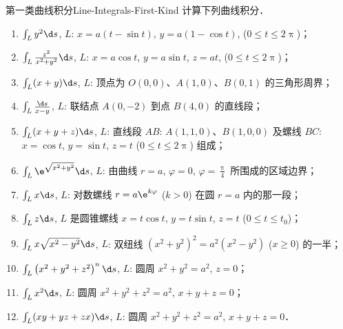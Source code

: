\begin{problem}{第一类曲线积分}{Line-Integrals-First-Kind}
    计算下列曲线积分．
    \begin{enumerate}
        \item $\int_{L} y^{2} \d s$, $L$: $x=a(t-\sin t)$, $y=a(1-\cos t)$, ($0 \le t \le 2 \uppi$)；
        \item $\int_{L} \frac{z^{2}}{x^{2}+y^{2}} \d s$, $L$: $x=a \cos t$, $y=a \sin t$, $z=a t$, ($0 \le t \le 2 \uppi$)；
        \item $\int_{L}(x+y) \d s$, $L$: 顶点为 $O(0,0)$、$A(1,0)$、$B(0,1)$ 的三角形周界；
        \item $\int_{L} \frac{\d s}{x-y}$, $L$: 联结点 $A(0,-2)$ 到点 $B(4,0)$ 的直线段；
        \item $\int_{L}(x+y+z) \d s$, $L$: 直线段 $AB$: $A(1,1,0)$、$B(1,0,0)$ 及螺线 $BC$: $x=\cos t$, $y=\sin t$, $z=t$ ($0 \le t \le 2 \uppi$) 组成；
        \item $\int_{L} \e^{\sqrt{x^{2}+y^{2}}} \d s$, $L$: 由曲线 $r=a$, $\varphi=0$, $\varphi=\frac{\uppi}{4}$ 所围成的区域边界；
        \item $\int_{L} x \d s$, $L$: 对数螺线 $r=a \e^{k \varphi}$ ($k>0$) 在圆 $r=a$ 内的那一段；
        \item $\int_{L} z \d s$, $L$ 是圆锥螺线 $x=t \cos t$, $y=t \sin t$, $z=t$ ($0 \le t \le t_{0}$)；
        \item $\int_{L} x \sqrt{x^{2}-y^{2}} \d s$, $L$: 双纽线 $\left(x^{2}+y^{2}\right)^{2}=a^{2}\left(x^{2}-y^{2}\right)$ ($x \ge 0$) 的一半；
        \item $\int_{L}\left(x^{2}+y^{2}+z^{2}\right)^{n} \d s$, $L$: 圆周 $x^{2}+y^{2}=a^{2}$, $z=0$；
        \item $\int_{L} x^{2} \d s$, $L$: 圆周 $x^{2}+y^{2}+z^{2}=a^{2}$, $x+y+z=0$；
        \item $\int_{L}(x y+y z+z x) \d s$, $L$: 圆周 $x^{2}+y^{2}+z^{2}=a^{2}$, $x+y+z=0$．
    \end{enumerate}
\end{problem}

